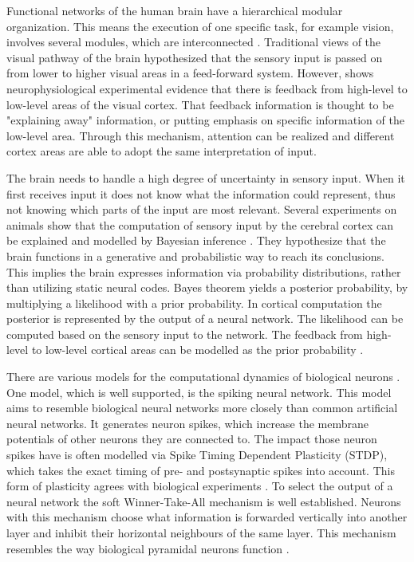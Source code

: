 Functional networks of the human brain have a hierarchical modular organization. This means the execution of one specific task, for example vision, involves several modules, which are interconnected  \citep{hierarchicalBrain}. Traditional views of the visual pathway of the brain hypothesized that the sensory input is passed on from lower to higher visual areas in a feed-forward system. However, \citet{HierachicalBayesVisualCortex} shows  neurophysiological experimental evidence that there is feedback from high-level to low-level areas of the visual cortex. That feedback information is thought to be "explaining away" information, or putting emphasis on specific information of the low-level area. Through this mechanism, attention can be realized and different cortex areas are able to adopt the same interpretation of  input.
 
The brain needs to handle a high degree of uncertainty in sensory input. When it first receives input it does not know what the information could represent, thus not knowing which parts of the input are most relevant. Several experiments on animals show that the computation of sensory input by the cerebral cortex can be explained and modelled by Bayesian inference \citep{neuralSubstrate, HierachicalBayesVisualCortex, anatomyOfInference}. They hypothesize that the brain functions in a generative and probabilistic way to reach its conclusions. This implies the brain expresses information via probability distributions, rather than utilizing static neural codes. 
Bayes theorem yields a posterior probability, by multiplying a likelihood with a prior probability. In cortical computation the posterior is  represented by the output of a neural network. The likelihood can be computed based on the sensory input to the network. The feedback from high-level to low-level cortical areas can be modelled as the prior probability \citep{nessler}.

There are various models for the computational dynamics of biological neurons \citep{SpikingNeuronModelsBook}. One model, which is well supported, is the spiking neural network. This model aims to resemble biological neural networks more closely than common artificial neural networks. It generates neuron spikes, which increase the membrane potentials of other neurons they are connected to. The impact those neuron spikes have is often modelled via Spike Timing Dependent Plasticity (STDP), which takes the exact timing of pre- and postsynaptic spikes into account. This form of plasticity agrees with biological experiments \citep{STDPFELDMAN, STDPDAN}. To select the output of a neural network the soft Winner-Take-All mechanism is well established. Neurons with this mechanism choose what information is forwarded vertically into another layer and inhibit their horizontal neighbours of the same layer. This mechanism resembles the way biological pyramidal neurons function \citep{softWTA}.

